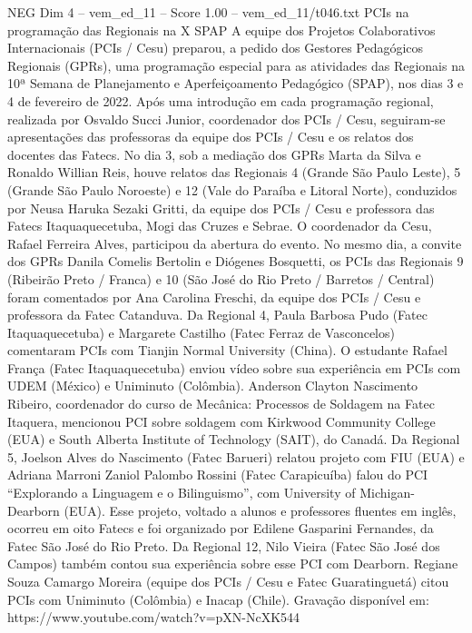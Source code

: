 \begin{textsample}{NEG Dim 4 – vem\_ed\_11 – Score 1.00 – vem\_ed\_11/t046.txt}  \label{ex:f4_neg_001}
PCIs na programação das Regionais na X SPAP A equipe dos Projetos Colaborativos Internacionais (PCIs / Cesu) preparou, a pedido dos Gestores Pedagógicos Regionais (GPRs), uma programação especial para as atividades das Regionais na 10ª Semana de Planejamento e Aperfeiçoamento Pedagógico (SPAP), nos dias 3 e 4 de fevereiro de 2022.
Após uma introdução em cada programação regional, realizada por Osvaldo Succi Junior, coordenador dos PCIs / Cesu, seguiram-se apresentações das professoras da equipe dos PCIs / Cesu e os relatos dos docentes das Fatecs.
No dia 3, sob a mediação dos GPRs Marta da Silva e Ronaldo Willian Reis, houve relatos das Regionais 4 (Grande São Paulo Leste), 5 (Grande São Paulo Noroeste) e 12 (Vale do Paraíba e Litoral Norte), conduzidos por Neusa Haruka Sezaki Gritti, da equipe dos PCIs / Cesu e professora das Fatecs Itaquaquecetuba, Mogi das Cruzes e Sebrae.
O coordenador da Cesu, Rafael Ferreira Alves, participou da abertura do evento.
No mesmo dia, a convite dos GPRs Danila Comelis Bertolin e Diógenes Bosquetti, os PCIs das Regionais 9 (Ribeirão Preto / Franca) e 10 (São José do Rio Preto / Barretos / Central) foram comentados por Ana Carolina Freschi, da equipe dos PCIs / Cesu e professora da Fatec Catanduva.
Da Regional 4, Paula Barbosa Pudo (Fatec Itaquaquecetuba) e Margarete Castilho (Fatec Ferraz de Vasconcelos) comentaram PCIs com Tianjin Normal University (China).
O estudante Rafael França (Fatec Itaquaquecetuba) enviou vídeo sobre sua experiência em PCIs com UDEM (México) e Uniminuto (Colômbia).
Anderson Clayton Nascimento Ribeiro, coordenador do curso de Mecânica: Processos de Soldagem na Fatec Itaquera, mencionou PCI sobre soldagem com Kirkwood Community College (EUA) e South Alberta Institute of Technology (SAIT), do Canadá.
Da Regional 5, Joelson Alves do Nascimento (Fatec Barueri) relatou projeto com FIU (EUA) e Adriana Marroni Zaniol Palombo Rossini (Fatec Carapicuíba) falou do PCI “Explorando a Linguagem e o Bilinguismo”, com University of Michigan-Dearborn (EUA).
Esse projeto, voltado a alunos e professores fluentes em inglês, ocorreu em oito Fatecs e foi organizado por Edilene Gasparini Fernandes, da Fatec São José do Rio Preto.
Da Regional 12, Nilo Vieira (Fatec São José dos Campos) também contou sua experiência sobre esse PCI com Dearborn.
Regiane Souza Camargo Moreira (equipe dos PCIs / Cesu e Fatec Guaratinguetá) citou PCIs com Uniminuto (Colômbia) e Inacap (Chile).
Gravação disponível em: https://www.youtube.com/watch?v=pXN-NcXK544

\end{textsample}
